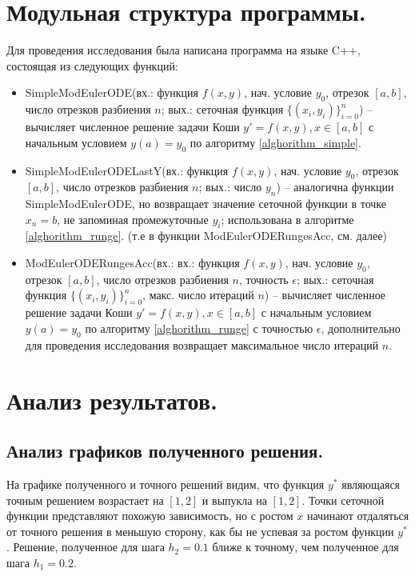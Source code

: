 \documentclass[a4paper, 12pt]{article}
\begin{document}
	\section{Модульная структура программы.}
	Для проведения исследования была написана программа на языке C++, состоящая из следующих функций:
	\begin{itemize}
		\item SimpleModEulerODE(вх.: функция $f(x,y)$, нач. условие $y_0$, отрезок $[a,b]$, число отрезков разбиения $n$; вых.: сеточная функция $\{(x_i,y_i)\}_{i=0}^n$) -- вычисляет численное решение задачи Коши $y'=f(x,y),x\in[a,b]$ с начальным условием $y(a)=y_0$ по алгоритму \ref{alghorithm_simple}.
		\item SimpleModEulerODELastY(вх.: функция $f(x,y)$, нач. условие $y_0$, отрезок $[a,b]$, число отрезков разбиения $n$; вых.: число $y_n$) -- аналогична функции SimpleModEulerODE, но возвращает значение сеточной функции в точке $x_n=b$, не запоминая промежуточные $y_i$; использована в алгоритме \ref{alghorithm_runge}. (т.е в функции ModEulerODERungesAcc, см. далее)
		\item ModEulerODERungesAcc(вх.: вх.: функция $f(x,y)$, нач. условие $y_0$, отрезок $[a,b]$, число отрезков разбиения $n$, точность $\epsilon$; вых.: сеточная функция $\{(x_i,y_i)\}_{i=0}^n$, макс. число итераций $n$) -- вычисляет численное решение задачи Коши $y'=f(x,y),x\in[a,b]$ с начальным условием $y(a)=y_0$ по алгоритму \ref{alghorithm_runge} с точностью $\epsilon$, дополнительно для проведения исследования возвращает максимальное число итераций $n$.
	\end{itemize}

	\section{Анализ результатов.}
	
	\subsection{Анализ графиков полученного решения.}
	
	На графике полученного и точного решений видим, что функция $y^*$ являющаяся точным решением возрастает на $[1,2]$ и выпукла на $[1,2]$. Точки сеточной функции представляют похожую зависимость, но с ростом $x$ начинают отдаляться от точного решения в меньшую сторону, как бы не успевая за ростом функции $y^*$. Решение, полученное для шага $h_2=0.1$ ближе к точному, чем полученное для шага $h_1=0.2$.
	
\end{document}
